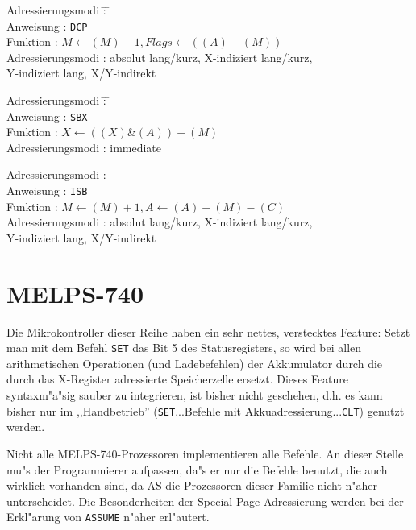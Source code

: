 \documentclass[12pt,a4paper,twoside]{report}
\newcommand{\tty}[1]{{\tt #1}}
\newcommand{\asname}{AS}
\begin{document}
\begin{tabbing}
Adressierungsmodi \= : \= \kill \\
Anweisung         \> : \> \tty{DCP} \\
Funktion          \> : \> $M \leftarrow(M)-1, Flags\leftarrow((A)-(M))$ \\
Adressierungsmodi \> : \> absolut lang/kurz, X-indiziert lang/kurz, \\
                  \>   \> Y-indiziert lang, X/Y-indirekt \\
\end{tabbing}
\begin{tabbing}
Adressierungsmodi \= : \= \kill \\
Anweisung         \> : \> \tty{SBX} \\
Funktion          \> : \> $X\leftarrow((X)\&(A))-(M)$ \\
Adressierungsmodi \> : \> immediate \\
\end{tabbing}
\begin{tabbing}
Adressierungsmodi \= : \= \kill \\
Anweisung         \> : \> \tty{ISB} \\
Funktion          \> : \> $M\leftarrow(M)+1, A\leftarrow(A)-(M)-(C)$ \\
Adressierungsmodi \> : \> absolut lang/kurz, X-indiziert lang/kurz, \\
                  \>   \> Y-indiziert lang, X/Y-indirekt \\
\end{tabbing}


\section{MELPS-740}

Die Mikrokontroller dieser Reihe haben ein sehr nettes, verstecktes
Feature: Setzt man mit dem Befehl \tty{SET} das Bit 5 des
Statusregisters, so wird bei allen arithmetischen Operationen (und
Ladebefehlen) der Akkumulator durch die durch das X-Register adressierte
Speicherzelle ersetzt.  Dieses Feature syntaxm"a"sig sauber zu integrieren,
ist bisher nicht geschehen, d.h. es kann bisher nur im ,,Handbetrieb''
(\tty{SET}...Befehle mit Akkuadressierung...\tty{CLT}) genutzt werden.
\par
Nicht alle MELPS-740-Prozessoren implementieren alle Befehle.  An dieser
Stelle mu"s der Programmierer aufpassen, da"s er nur die Befehle benutzt,
die auch wirklich vorhanden sind, da \asname{} die Prozessoren dieser Familie
nicht n"aher unterscheidet.  Die Besonderheiten der
Special-Page-Adressierung werden bei der Erkl"arung von \tty{ASSUME} n"aher
erl"autert.
\end{document}
